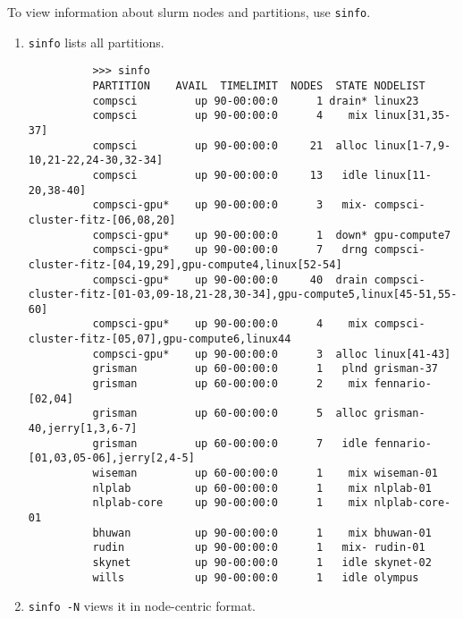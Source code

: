   \begin{definition}
    To view information about slurm nodes and partitions, use \texttt{sinfo}.
    \begin{enumerate}
      \item \texttt{sinfo} lists all partitions. 

        \begin{lstlisting}
          >>> sinfo
          PARTITION    AVAIL  TIMELIMIT  NODES  STATE NODELIST
          compsci         up 90-00:00:0      1 drain* linux23
          compsci         up 90-00:00:0      4    mix linux[31,35-37]
          compsci         up 90-00:00:0     21  alloc linux[1-7,9-10,21-22,24-30,32-34]
          compsci         up 90-00:00:0     13   idle linux[11-20,38-40]
          compsci-gpu*    up 90-00:00:0      3   mix- compsci-cluster-fitz-[06,08,20]
          compsci-gpu*    up 90-00:00:0      1  down* gpu-compute7
          compsci-gpu*    up 90-00:00:0      7   drng compsci-cluster-fitz-[04,19,29],gpu-compute4,linux[52-54]
          compsci-gpu*    up 90-00:00:0     40  drain compsci-cluster-fitz-[01-03,09-18,21-28,30-34],gpu-compute5,linux[45-51,55-60]
          compsci-gpu*    up 90-00:00:0      4    mix compsci-cluster-fitz-[05,07],gpu-compute6,linux44
          compsci-gpu*    up 90-00:00:0      3  alloc linux[41-43]
          grisman         up 60-00:00:0      1   plnd grisman-37
          grisman         up 60-00:00:0      2    mix fennario-[02,04]
          grisman         up 60-00:00:0      5  alloc grisman-40,jerry[1,3,6-7]
          grisman         up 60-00:00:0      7   idle fennario-[01,03,05-06],jerry[2,4-5]
          wiseman         up 60-00:00:0      1    mix wiseman-01
          nlplab          up 60-00:00:0      1    mix nlplab-01
          nlplab-core     up 90-00:00:0      1    mix nlplab-core-01
          bhuwan          up 90-00:00:0      1    mix bhuwan-01
          rudin           up 90-00:00:0      1   mix- rudin-01
          skynet          up 90-00:00:0      1   idle skynet-02
          wills           up 90-00:00:0      1   idle olympus 
        \end{lstlisting}
      \item \texttt{sinfo -N} views it in node-centric format. 


\end{enumerate}
\end{definition}
